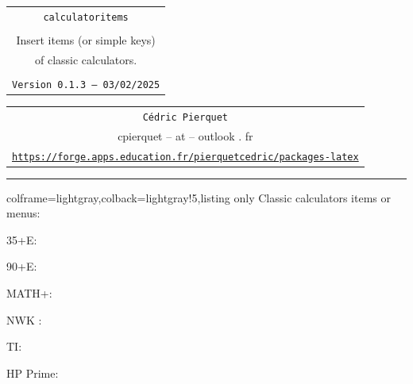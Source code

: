 \documentclass[11pt,a4paper]{ltxdoc}
\def\TPversion{0.1.3}
\def\TPdate{03/02/2025}
\begin{document}
\thispagestyle{empty}

\begin{center}
	\begin{minipage}{0.88\linewidth}
		\begin{tcolorbox}[colframe=yellow,colback=yellow!15]
			\begin{center}
				\renewcommand{\arraystretch}{1.25}%
				\begin{tabular}{c}
					{\Huge \texttt{calculatoritems}}\\
					\\
					{\LARGE Insert items (or simple keys)} \\
					{\LARGE of classic calculators.} \\
					\\
					{\small \texttt{Version \TPversion{} -- \TPdate}}
				\end{tabular}
			\end{center}
		\end{tcolorbox}
	\end{minipage}
\end{center}

\begin{center}
	\begin{tabular}{c}
		\texttt{Cédric Pierquet}\\
		{\ttfamily cpierquet -- at -- outlook . fr}\\
		\texttt{\url{https://forge.apps.education.fr/pierquetcedric/packages-latex}} \\
	\end{tabular}
\end{center}

\hrule

\vfill

\begin{tcblisting}{colframe=lightgray,colback=lightgray!5,listing only}
Classic calculators items or menus:

35+E:

90+E:

MATH+:

NWK :

TI:

HP Prime:
\end{tcblisting}
\end{document}
